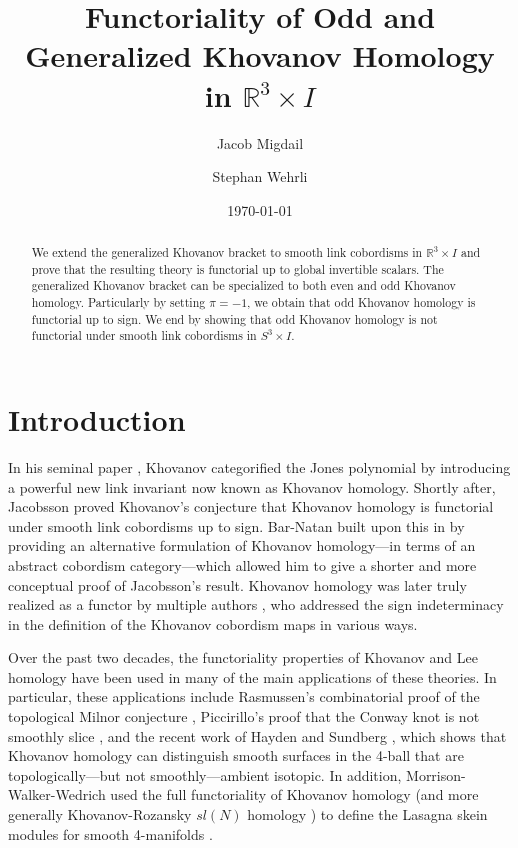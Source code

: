 \documentclass[12pt]{amsart}
\title{Functoriality of Odd and Generalized Khovanov Homology in $\mathbb{R}^3\times I$}
\author{Jacob Migdail}
\author{Stephan Wehrli}
\date{\today}
\theoremstyle{definition}
\theoremstyle{plain}
\begin{document}
\begin{abstract} 
We extend the generalized Khovanov bracket to smooth link cobordisms in \mbox{$\mathbb{R}^3\times I$} and prove that the resulting theory is functorial up to global invertible scalars. The generalized Khovanov bracket can be specialized to both even and odd Khovanov homology.  Particularly by setting $\pi=-1$, we obtain that odd Khovanov homology is functorial up to sign. We end by showing that odd Khovanov homology is not functorial under smooth link cobordisms in $S^3\times I$.
\end{abstract}

\maketitle

\section{Introduction}\label{s:intro}

In his seminal paper \cite{Kh1999}, Khovanov categorified the Jones polynomial \cite{Jo1985}
by introducing a powerful new link invariant now known as Khovanov homology.
Shortly after, Jacobsson \cite{Ja2004} proved Khovanov's 
conjecture that Khovanov homology is functorial 
under smooth link cobordisms up to sign.
Bar-Natan built upon this in  \cite{Bn2005} by providing an alternative formulation
of Khovanov homology---in terms of
an abstract cobordism category---which allowed him to give
a shorter and more conceptual proof of Jacobsson's result.
Khovanov homology was later truly realized as a functor
by multiple authors
 \cite{Ca2007,CMW2009,Bl2010,BHPW2019,Vo2020,Sa2021},
 who addressed the sign indeterminacy in the definition of the Khovanov cobordism maps
 in various ways.

Over the past two decades, the functoriality properties of Khovanov and Lee homology \cite{Le2005}
have been used in many of the main applications of these
theories. In particular, these applications include Rasmussen's combinatorial proof of the topological Milnor conjecture \cite{Ra2004},
Piccirillo's proof that the Conway knot is not smoothly slice \cite{Pi2020}, and the recent work of Hayden and Sundberg \cite{HS2022}, which shows that Khovanov homology can distinguish smooth surfaces in the 4-ball that are
topologically---but not smoothly---ambient isotopic.
In addition, Morrison-Walker-Wedrich used the full functoriality
of Khovanov homology (and more generally Khovanov-Rozansky $sl(N)$ homology \cite{KR2008, EK2010})
to define the Lasagna skein modules for smooth 4-manifolds \cite{MWW2022}.
\end{document}
